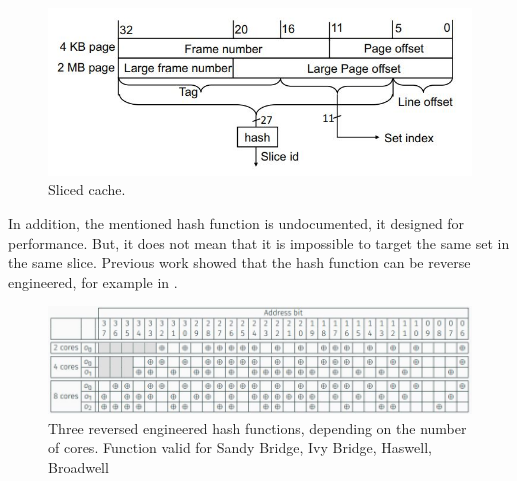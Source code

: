 \begin{figure}[!ht]
    \centering
    \includegraphics[width=\textwidth]{images/chapter_6/slicedcache.JPG}
    \caption{Sliced cache.}
    \label{fig:slicedcache}
\end{figure}

In addition, the mentioned hash function is undocumented, it designed for performance. But, it does not mean that it is impossible to target the same set in the same slice. Previous work \cite{EURECOM+4671} showed that the hash function can be reverse engineered, for example in .

\begin{figure}[!ht]
    \centering
    \includegraphics[width=\textwidth]{images/chapter_6/hashfunc.JPG}
    \caption{Three reversed engineered hash functions, depending on the number of cores. Function valid for Sandy Bridge, Ivy Bridge, Haswell, Broadwell}
    \label{fig:hashfunc}
\end{figure}

